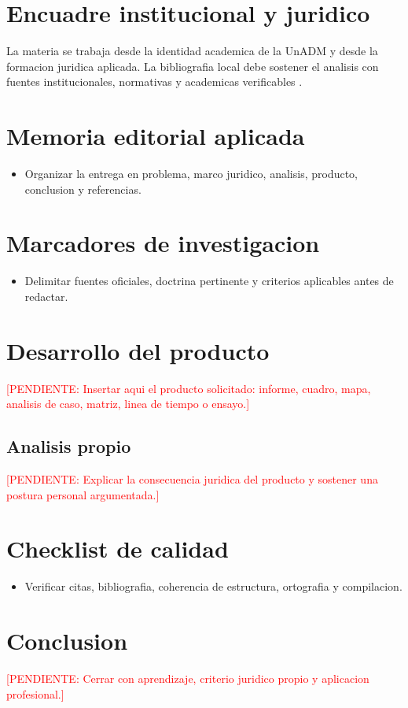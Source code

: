 \documentclass[12pt,letterpaper,oneside]{article}
\newcommand{\pendiente}[1]{\textcolor{red}{[PENDIENTE: #1]}}
\begin{document}
\section{Encuadre institucional y juridico}
La materia se trabaja desde la identidad academica de la UnADM y desde la
formacion juridica aplicada. La bibliografia local debe sostener el analisis
con fuentes institucionales, normativas y academicas verificables \citep{unadmSitioWeb,unadmMallaDerecho2024}.

\section{Memoria editorial aplicada}
\begin{itemize}
  \item Organizar la entrega en problema, marco juridico, analisis, producto, conclusion y referencias.
\end{itemize}

\section{Marcadores de investigacion}
\begin{itemize}
  \item Delimitar fuentes oficiales, doctrina pertinente y criterios aplicables antes de redactar.
\end{itemize}

\section{Desarrollo del producto}
\pendiente{Insertar aqui el producto solicitado: informe, cuadro, mapa, analisis de caso, matriz, linea de tiempo o ensayo.}

\subsection{Analisis propio}
\pendiente{Explicar la consecuencia juridica del producto y sostener una postura personal argumentada.}

\section{Checklist de calidad}
\begin{itemize}
  \item Verificar citas, bibliografia, coherencia de estructura, ortografia y compilacion.
\end{itemize}

\section{Conclusion}
\pendiente{Cerrar con aprendizaje, criterio juridico propio y aplicacion profesional.}

\clearpage
\nocite{unadmSitioWeb,unadmMallaDerecho2024}

\end{document}
